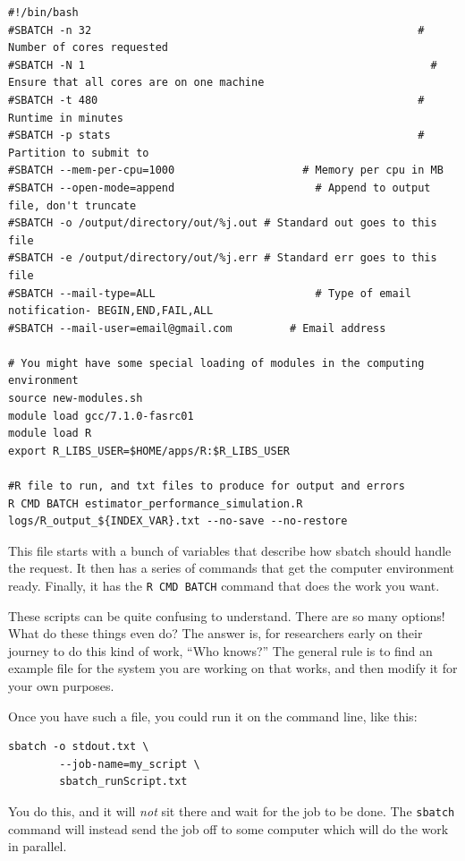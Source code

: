 \documentclass[
]{book}
\begin{document}
\begin{verbatim}
#!/bin/bash
#SBATCH -n 32                                                   # Number of cores requested
#SBATCH -N 1                                                      # Ensure that all cores are on one machine
#SBATCH -t 480                                                  # Runtime in minutes
#SBATCH -p stats                                                # Partition to submit to
#SBATCH --mem-per-cpu=1000                    # Memory per cpu in MB
#SBATCH --open-mode=append                      # Append to output file, don't truncate
#SBATCH -o /output/directory/out/%j.out # Standard out goes to this file
#SBATCH -e /output/directory/out/%j.err # Standard err goes to this file
#SBATCH --mail-type=ALL                         # Type of email notification- BEGIN,END,FAIL,ALL
#SBATCH --mail-user=email@gmail.com         # Email address

# You might have some special loading of modules in the computing environment
source new-modules.sh
module load gcc/7.1.0-fasrc01
module load R
export R_LIBS_USER=$HOME/apps/R:$R_LIBS_USER

#R file to run, and txt files to produce for output and errors
R CMD BATCH estimator_performance_simulation.R logs/R_output_${INDEX_VAR}.txt --no-save --no-restore
\end{verbatim}

This file starts with a bunch of variables that describe how sbatch should handle the request.
It then has a series of commands that get the computer environment ready.
Finally, it has the \texttt{R\ CMD\ BATCH} command that does the work you want.

These scripts can be quite confusing to understand.
There are so many options!
What do these things even do?
The answer is, for researchers early on their journey to do this kind of work, ``Who knows?''
The general rule is to find an example file for the system you are working on that works, and then modify it for your own purposes.

Once you have such a file, you could run it on the command line, like this:

\begin{verbatim}
sbatch -o stdout.txt \
        --job-name=my_script \
        sbatch_runScript.txt
\end{verbatim}

You do this, and it will \emph{not} sit there and wait for the job to be done.
The \texttt{sbatch} command will instead send the job off to some computer which will do the work in parallel.
\end{document}
